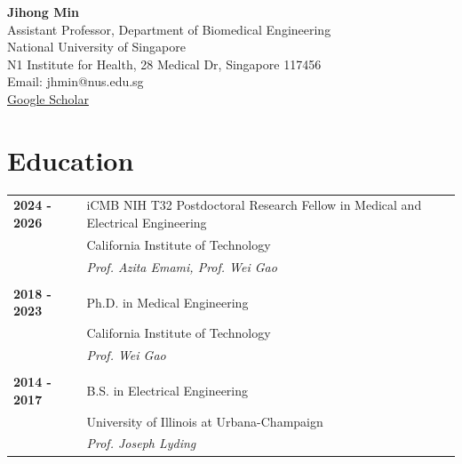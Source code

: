 \documentclass[11pt,a4paper]{article}
\begin{document}
{\LARGE \textbf{Jihong Min}} \\[4pt]
Assistant Professor, Department of Biomedical Engineering \\
National University of Singapore \\
N1 Institute for Health, 28 Medical Dr, Singapore 117456 \\
Email: jhmin@nus.edu.sg \\
\href{https://scholar.google.com/citations?user=T4pVa1UAAAAJ}{Google Scholar}

\section{Education}
\begin{tabular}{@{} >{\bfseries}p{2.2cm} p{\dimexpr\textwidth-2.5cm\relax} @{}}
2024 - 2026 & iCMB NIH T32 Postdoctoral Research Fellow in Medical and Electrical Engineering \\
 & California Institute of Technology \\
 & \textit{Prof. Azita Emami, Prof. Wei Gao} \\
 & \\[4pt]
2018 - 2023 & Ph.D. in Medical Engineering \\
 & California Institute of Technology \\
 & \textit{Prof. Wei Gao} \\
 & \\[4pt]
2014 - 2017 & B.S. in Electrical Engineering \\
 & University of Illinois at Urbana-Champaign \\
 & \textit{Prof. Joseph Lyding} \\
\end{tabular}
\end{document}
